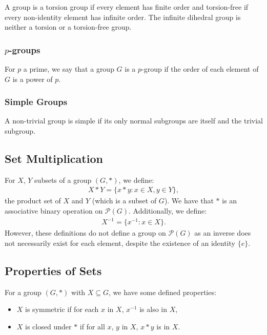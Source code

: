 A group is a torsion group if every element has finite order and 
torsion-free if every non-identity element has infinite order.
The infinite dihedral group is neither a torsion or a torsion-free
group.

\subsubsection{$p$-groups}

For $p$ a prime, we say that a group $G$ is a $p$-group if the order
of each element of $G$ is a power of $p$.

\subsubsection{Simple Groups}

A non-trivial group is simple if its only normal subgroups are itself 
and the trivial subgroup.

\subsection{Set Multiplication} \label{1.5}

For $X$, $Y$ subsets of a group $(G, \ast)$, we define: \begin{align*}
    X \ast Y = \{x \ast y : x \in X, y \in Y\},
\end{align*} the product set of $X$ and $Y$ (which is a subset of $G$).
We have that $\ast$ is an associative binary operation on 
$\mathcal{P}(G)$. Additionally, we define: \begin{align*}
    X^{-1} = \{x^{-1} : x \in X\}.
\end{align*} However, these definitions do not define a group on
$\mathcal{P}(G)$ as an inverse does not necessarily exist for each
element, despite the existence of an identity $\{e\}$.

\subsection{Properties of Sets}

For a group $(G, \ast)$ with $X \subseteq G$, we have some defined properties:
\begin{itemize}
    \item $X$ is symmetric if for each $x$ in $X$, $x^{-1}$ is also in $X$,
    \item $X$ is closed under $\ast$ if for all $x$, $y$ in $X$, $x \ast y$ is in $X$.
\end{itemize}

